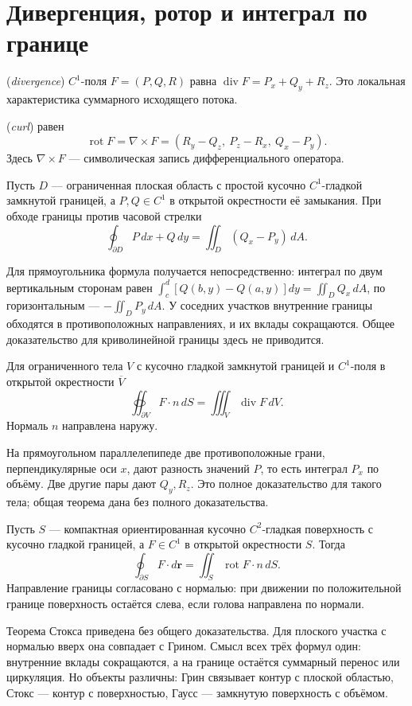 \section{Дивергенция, ротор и интеграл по границе}
\begin{definition} (\emph{divergence}) \(C^1\)-поля \(F=(P,Q,R)\) равна \(\operatorname{div}F=P_x+Q_y+R_z\). Это локальная характеристика суммарного исходящего потока.\end{definition}
\begin{definition} (\emph{curl}) равен
\[
\operatorname{rot}F=\nabla\times F=(R_y-Q_z,\ P_z-R_x,\ Q_x-P_y).
\]
Здесь \(\nabla\times F\) — символическая запись дифференциального оператора.
\end{definition}
\begin{theorem}
Пусть \(D\) — ограниченная плоская область с простой кусочно \(C^1\)-гладкой замкнутой границей, а \(P,Q\in C^1\) в открытой окрестности её замыкания. При обходе границы против часовой стрелки
\[
\oint_{\partial D}P\,dx+Q\,dy
=\iint_D(Q_x-P_y)\,dA.
\]
\end{theorem}
Для прямоугольника формула получается непосредственно: интеграл по двум вертикальным сторонам равен \(\int_c^d[Q(b,y)-Q(a,y)]dy=\iint_DQ_x\,dA\), по горизонтальным — \(-\iint_DP_y\,dA\). У соседних участков внутренние границы обходятся в противоположных направлениях, и их вклады сокращаются. Общее доказательство для криволинейной границы здесь не приводится.
\begin{theorem}
Для ограниченного тела \(V\) с кусочно гладкой замкнутой границей и \(C^1\)-поля в открытой окрестности \(\overline V\)
\[
\oiint_{\partial V}F\cdot n\,dS
=\iiint_V\operatorname{div}F\,dV.
\]
Нормаль \(n\) направлена наружу.
\end{theorem}
На прямоугольном параллелепипеде две противоположные грани, перпендикулярные оси \(x\), дают разность значений \(P\), то есть интеграл \(P_x\) по объёму. Две другие пары дают \(Q_y,R_z\). Это полное доказательство для такого тела; общая теорема дана без полного доказательства.
\begin{theorem}
Пусть \(S\) — компактная ориентированная кусочно \(C^2\)-гладкая поверхность с кусочно гладкой границей, а \(F\in C^1\) в открытой окрестности \(S\). Тогда
\[
\oint_{\partial S}F\cdot d\symbf r
=\iint_S\operatorname{rot}F\cdot n\,dS.
\]
Направление границы согласовано с нормалью: при движении по положительной границе поверхность остаётся слева, если голова направлена по нормали.
\end{theorem}
Теорема Стокса приведена без общего доказательства. Для плоского участка с нормалью вверх она совпадает с Грином. Смысл всех трёх формул один: внутренние вклады сокращаются, а на границе остаётся суммарный перенос или циркуляция. Но объекты различны: Грин связывает контур с плоской областью, Стокс — контур с поверхностью, Гаусс — замкнутую поверхность с объёмом.

